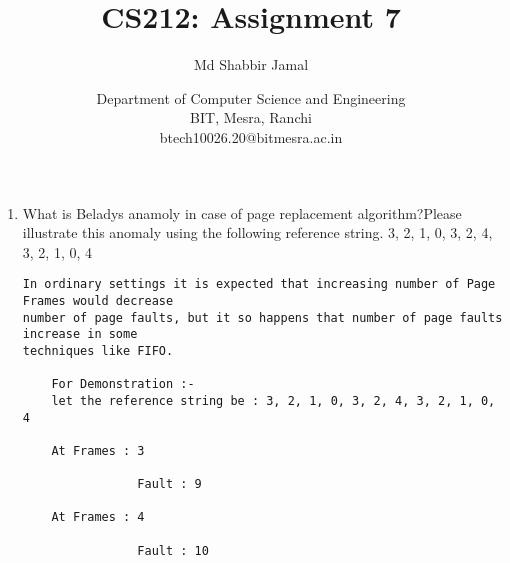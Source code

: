 \documentclass{article}
\title{CS212: Assignment 7}
\author{Md Shabbir Jamal}
\date{Department of Computer Science and Engineering\\
BIT, Mesra, Ranchi\\
btech10026.20@bitmesra.ac.in
}
\begin{document}
\maketitle

\begin{enumerate}
    
\item {{\large What is Beladys anamoly in case of page replacement algorithm?Please illustrate this anomaly using the following reference string. 3, 2, 1, 0, 3, 2, 4, 3, 2, 1, 0, 4}
\begin{verbatim}
In ordinary settings it is expected that increasing number of Page Frames would decrease
number of page faults, but it so happens that number of page faults increase in some 
techniques like FIFO.

    For Demonstration :-
    let the reference string be : 3, 2, 1, 0, 3, 2, 4, 3, 2, 1, 0, 4

    At Frames : 3

                Fault : 9

    At Frames : 4

                Fault : 10
    

    
\end{verbatim}
}
\end{enumerate}
\end{document}
